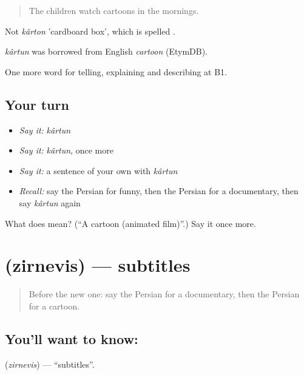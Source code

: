 \begin{quote}
The children watch cartoons in the mornings.
\end{quote}

Not \emph{kârton} 'cardboard box', which is spelled .

\begin{cousinweb}
\emph{kârtun} was borrowed from English \emph{cartoon} (EtymDB).
\end{cousinweb}

\begin{grammarlens}[title={What you've built}]
One more word for telling, explaining and describing at B1.
\end{grammarlens}

\subsection*{Your turn}
\begin{itemize}
\raggedright
  \item \emph{Say it:} \emph{kârtun}
  \item \emph{Say it:} \emph{kârtun}, once more
  \item \emph{Say it:} a sentence of your own with \emph{kârtun}
  \item \emph{Recall:} say the Persian for funny, then the Persian for a documentary, then say \emph{kârtun} again
\end{itemize}

\begin{tcolorbox}[breakable,colback=teal!4,colframe=teal!35!black,title={Before you move on}]
What does  mean? (\textquotedblleft{}A cartoon (animated film)\textquotedblright{}.) Say it once more.
\end{tcolorbox}
\section[\texorpdfstring{\fa{زیرنویس} (zirnevis)}{زیرنویس (zirnevis)}]{ (zirnevis) — subtitles}

\label{lesson:FA-C531-zirnevis}



\begin{quote}
Before the new one: say the Persian for a documentary, then the Persian for a cartoon.
\end{quote}

\subsection*{You'll want to know: }
\textbf{} (\emph{zirnevis}) — \textquotedblleft{}subtitles\textquotedblright{}.

